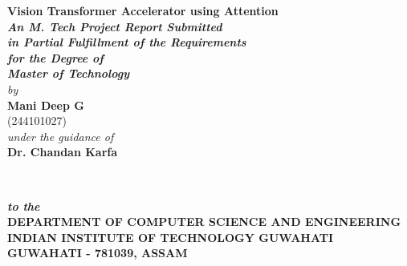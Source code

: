 \begin{titlepage}
\begin{center}
\textheight 15.5in \textwidth 12.5in {\large\sf  \textbf{Vision Transformer Accelerator using Attention}}\\[12ex]
{\small{\textsl{ \textbf{An M. Tech Project Report Submitted \\
in Partial Fulfillment of the Requirements \\
for the Degree of
\\[3ex]\small \bf Master of Technology}}}}\\[16ex] \emph{by} \\[2ex]
{\sf \sf \textbf{Mani Deep G}\\
         (244101027)}\\[1ex]
\emph{under the guidance of}\\[2ex]
{\sf \bf Dr. Chandan Karfa} \\[7ex]

\vspace{1.2in}

 \begin{figure}[!h]
 \hfill
  \hfill \
 \end{figure}

{\sl \bf{to the}} \\[1ex]

{\small\bf DEPARTMENT OF COMPUTER SCIENCE AND ENGINEERING}  \\[1ex]
{\small \bf{INDIAN INSTITUTE OF TECHNOLOGY GUWAHATI \\GUWAHATI - 781039, ASSAM}}
\\[2ex]
%
\end{center}
\end{titlepage}